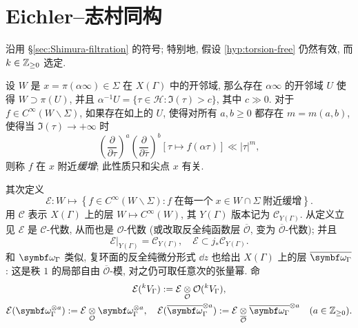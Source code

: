 \section{Eichler--志村同构}
沿用 \S\ref{sec:Shimura-filtration} 的符号; 特别地, 假设 \ref{hyp:torsion-free} 仍然有效, 而 $k \in \mathbb{Z}_{\geq 0}$ 选定.

\begin{convention}
	设 $W$ 是 $x = \pi(\alpha\infty) \in \Sigma$ 在 $X(\Gamma)$ 中的开邻域, 那么存在 $\alpha\infty$ 的开邻域 $U$ 使得 $W \supset \pi(U)$, 并且 $\alpha^{-1} U = \{\tau \in \mathcal{H}: \Im(\tau) > c \}$, 其中 $c \gg 0$. 对于 $f \in C^\infty(W \smallsetminus \Sigma)$, 如果存在如上的 $U$, 使得对所有 $a, b \geq 0$ 都存在 $m = m(a,b)$, 使得当 $\Im(\tau) \to +\infty$ 时
	\[ \left( \frac{\partial}{\partial\tau} \right)^a \left( \frac{\partial}{\partial\overline{\tau}} \right)^b \left[ \tau \mapsto f(\alpha \tau) \right] \ll |\tau|^m, \]
	则称 $f$ 在 $x$ 附近\emph{缓增}; 此性质只和尖点 $x$ 有关.
\end{convention}

其次定义
\[ \mathcal{E}: W \mapsto \left\{ f \in C^\infty(W \smallsetminus \Sigma) : f\; \text{在每一个}\; x \in W \cap \Sigma\; \text{附近缓增} \right\}. \]
用 $\mathcal{C}$ 表示 $X(\Gamma)$ 上的层 $W \mapsto C^\infty(W)$, 其 $Y(\Gamma)$ 版本记为 $\mathcal{C}_{Y(\Gamma)}$. 从定义立见 $\mathcal{E}$ 是 $\mathcal{C}$-代数, 从而也是 $\mathcal{O}$-代数 (或改取反全纯函数层 $\overline{\mathcal{O}}$, 变为 $\overline{\mathcal{O}}$-代数); 并且
\[ \mathcal{E}|_{Y(\Gamma)} = \mathcal{C}_{Y(\Gamma)}, \quad \mathcal{E} \subset j_* \mathcal{C}_{Y(\Gamma)}. \]
和 $\bomega_\Gamma$ 类似, 复环面的反全纯微分形式 $\dd z$ 也给出 $X(\Gamma)$ 上的层 $\overline{\bomega_\Gamma}$: 这是秩 $1$ 的局部自由 $\overline{\mathcal{O}}$-模, 对之仍可取任意次的张量幂. 命
\begin{gather*}
	\mathcal{E}({}^k V_\Gamma) := \mathcal{E} \dotimes{\mathcal{O}} \mathcal{O}({}^k V_\Gamma), \\
	\mathcal{E}(\bomega_\Gamma^{\otimes a}) := \mathcal{E} \dotimes{\mathcal{O}} \bomega_\Gamma^{\otimes a}, \quad \mathcal{E}(\overline{\bomega}_\Gamma^{\otimes a}) := \mathcal{E} \dotimes{\overline{\mathcal{O}}} \overline{\bomega_\Gamma}^{\otimes a} \quad (a \in \Z_{\geq 0}).
\end{gather*}


